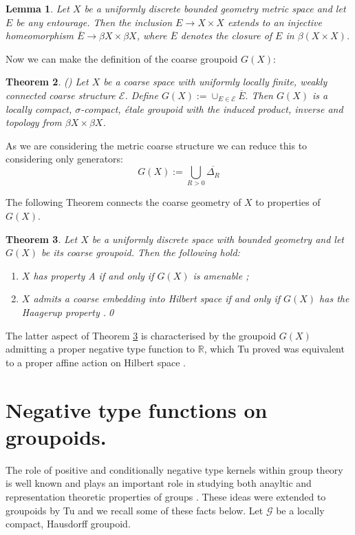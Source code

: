 \documentclass[11pt]{amsart}
\theoremstyle{plain}
\newtheorem{theorem}{Theorem}%
\newtheorem{lemma}[theorem]{Lemma}%
\theoremstyle{definition}%
\theoremstyle{remark}%
\newcommand{\G}{\mathcal{G}}
\begin{document}
\begin{lemma}\label{Lem:CorRoe} 
Let $X$ be a uniformly discrete bounded geometry metric space and let $E$ be any entourage. Then the inclusion $E \rightarrow X \times X$ extends to an injective homeomorphism $\overline{E} \rightarrow \beta X \times \beta X$, where $\overline{E}$ denotes the closure of $E$ in $\beta(X \times X)$.
\end{lemma}
Now we can make the definition of the coarse groupoid $G(X)$:
\begin{theorem}(\cite[Theorem 10.20]{MR2007488})
Let $X$ be a coarse space with uniformly locally finite, weakly connected coarse structure $\mathcal{E}$. Define $G(X):=\cup_{E\in \mathcal{E}}\overline{E}.$ Then $G(X)$ is a locally compact, $\sigma$-compact, \'etale groupoid with the induced product, inverse and topology from $\beta X \times \beta X$.
\end{theorem}
As we are considering the metric coarse structure we can reduce this to considering only generators:
\begin{equation*}
G(X):=\bigcup_{R>0}\overline{\Delta_{R}}
\end{equation*}

The following Theorem connects the coarse geometry of $X$ to properties of $G(X)$.

\begin{theorem}\label{thm:coarseprop}
Let $X$ be a uniformly discrete space with bounded geometry and let $G(X)$ be its coarse groupoid. Then the following hold:
\begin{enumerate}
\item $X$ has property A if and only if $G(X)$ is amenable \cite[Theorem 5.3]{MR1905840};
\item $X$ admits a coarse embedding into Hilbert space if and only if $G(X)$ has the Haagerup property \cite[Theorem 5.4]{MR1905840}.\qed
\end{enumerate}
\end{theorem}

The latter aspect of Theorem \ref{thm:coarseprop} is characterised by the groupoid $G(X)$ admitting a proper negative type function to $\mathbb{R}$, which Tu proved was equivalent to a proper affine action on Hilbert space \cite{MR1703305}.

\section{Negative type functions on groupoids.}\label{sect:negtype}
The role of positive and conditionally negative type kernels within group theory is well known and plays an important role in studying both anayltic and representation theoretic properties of groups \cite{MR2415834,MR1487204}. These ideas were extended to groupoids by Tu \cite{MR1703305} and we recall some of these facts below. Let $\G$ be a locally compact, Hausdorff groupoid.
\end{document}
